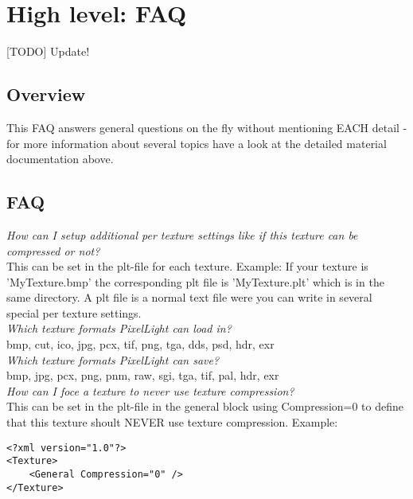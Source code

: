 \chapter{High level: FAQ}


[TODO] Update!



\section{Overview}
This FAQ answers general questions on the fly without mentioning EACH detail - for more information
about several topics have a look at the detailed material documentation above.\\




\section{FAQ}


\emph{How can I setup additional per texture settings like if this texture can be compressed or not?}\\
This can be set in the plt-file for each texture. Example: If your texture is 'MyTexture.bmp' the
corresponding plt file is 'MyTexture.plt' which is in the same directory. A plt file is a normal
text file were you can write in several special per texture settings.\\


\emph{Which texture formats PixelLight can load in?}\\
bmp, cut, ico, jpg, pcx, tif, png, tga, dds, psd, hdr, exr\\


\emph{Which texture formats PixelLight can save?}\\
bmp, jpg, pcx, png, pnm, raw, sgi, tga, tif, pal, hdr, exr\\


\emph{How can I foce a texture to never use texture compression?}\\
This can be set in the plt-file in the general block using Compression=0 to define that this
texture shoult NEVER use texture compression. Example:\\

\begin{lstlisting}[caption=plt-file disable texture compression]
<?xml version="1.0"?>
<Texture>
    <General Compression="0" />
</Texture>
\end{lstlisting}

